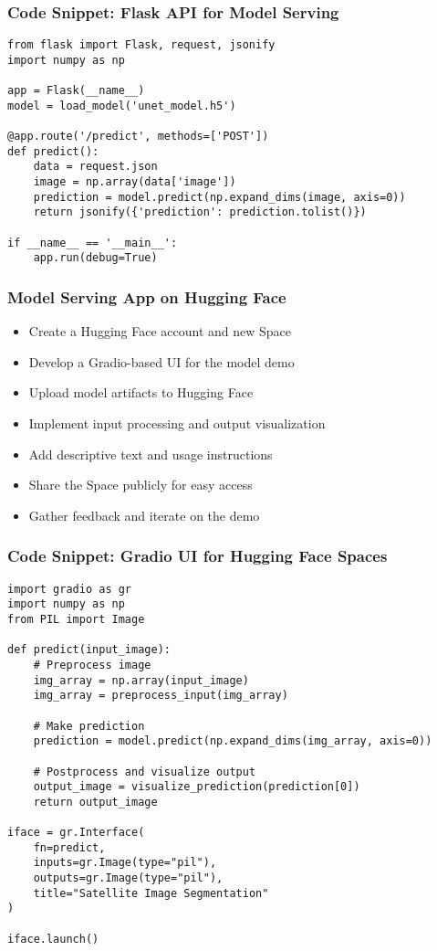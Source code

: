 \begin{frame}[fragile]\frametitle{Code Snippet: Flask API for Model Serving}
\begin{lstlisting}
from flask import Flask, request, jsonify
import numpy as np

app = Flask(__name__)
model = load_model('unet_model.h5')

@app.route('/predict', methods=['POST'])
def predict():
    data = request.json
    image = np.array(data['image'])
    prediction = model.predict(np.expand_dims(image, axis=0))
    return jsonify({'prediction': prediction.tolist()})

if __name__ == '__main__':
    app.run(debug=True)
\end{lstlisting}
\end{frame}

\begin{frame}[fragile]\frametitle{Model Serving App on Hugging Face}
\begin{itemize}
\item Create a Hugging Face account and new Space
\item Develop a Gradio-based UI for the model demo
\item Upload model artifacts to Hugging Face
\item Implement input processing and output visualization
\item Add descriptive text and usage instructions
\item Share the Space publicly for easy access
\item Gather feedback and iterate on the demo
\end{itemize}
\end{frame}

\begin{frame}[fragile]\frametitle{Code Snippet: Gradio UI for Hugging Face Spaces}
\begin{lstlisting}
import gradio as gr
import numpy as np
from PIL import Image

def predict(input_image):
    # Preprocess image
    img_array = np.array(input_image)
    img_array = preprocess_input(img_array)
    
    # Make prediction
    prediction = model.predict(np.expand_dims(img_array, axis=0))
    
    # Postprocess and visualize output
    output_image = visualize_prediction(prediction[0])
    return output_image

iface = gr.Interface(
    fn=predict,
    inputs=gr.Image(type="pil"),
    outputs=gr.Image(type="pil"),
    title="Satellite Image Segmentation"
)

iface.launch()
\end{lstlisting}
\end{frame}


